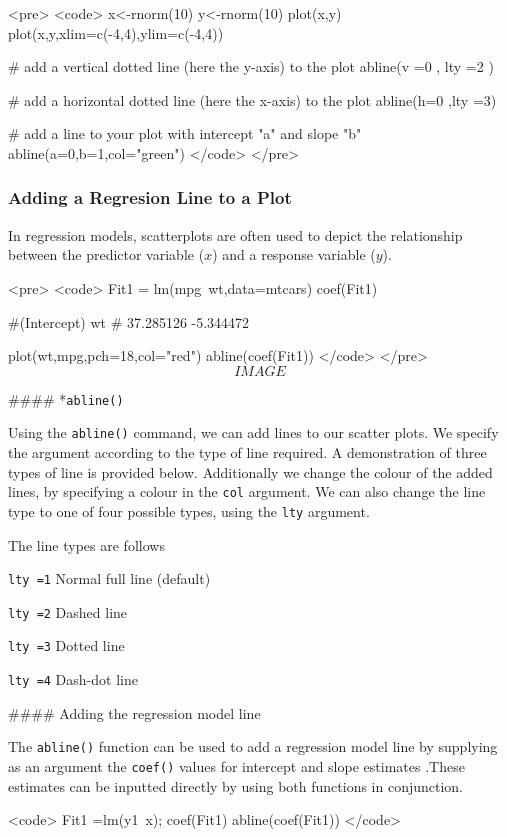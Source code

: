 
<pre> 
<code>
x<-rnorm(10)
y<-rnorm(10)
plot(x,y)
plot(x,y,xlim=c(-4,4),ylim=c(-4,4))

# add a vertical dotted line (here the y-axis) to the plot
abline(v =0 , lty =2 ) 

# add a horizontal dotted line (here the x-axis) to the plot
abline(h=0  ,lty =3)    

# add a line to your plot with intercept "a" and slope "b"
abline(a=0,b=1,col="green") 
</code>
</pre>
 
\subsubsection{Adding a Regresion Line to a Plot}
In regression models, scatterplots are often used to depict the relationship between the predictor variable ($x$) and a response variable ($y$).


<pre>
<code>
Fit1 = lm(mpg~wt,data=mtcars)
coef(Fit1)

#(Intercept)          wt 
#  37.285126   -5.344472 

plot(wt,mpg,pch=18,col="red")
abline(coef(Fit1))
</code>
</pre>
\[IMAGE\]


#### *{\texttt{abline()}}

Using the \texttt{abline()} command, we can add lines to our scatter plots. We specify the argument according to the type of line required. A demonstration of three types of line is provided below.
Additionally we change the colour of the added lines, by specifying a colour in the \texttt{col} argument. We can also change the line type to one of four possible types, using the \texttt{lty} argument.


The line types are follows

	\item	\texttt{lty =1}   Normal full line (default)
	\item	\texttt{lty =2}   Dashed line
	\item	\texttt{lty =3}   Dotted line
	\item	\texttt{lty =4}   Dash-dot line

\footnotesize 






#### {Adding the regression model line}

The \texttt{abline()} function can be used to add a regression model line  by supplying as an argument the \texttt{coef()} values for intercept and slope estimates .These estimates can be inputted directly by using both functions in conjunction.

\footnotesize <code>
Fit1 =lm(y1~x);  coef(Fit1)
abline(coef(Fit1))	
</code>


